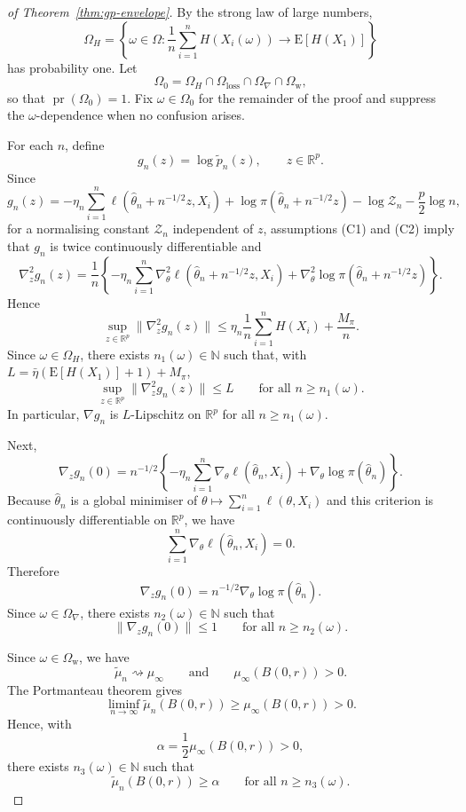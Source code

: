 \documentclass[10pt,a4paper]{amsart}
\renewcommand{\Pr}{\operatorname{pr}}
\begin{document}
\begin{proof}[of Theorem~\ref{thm:gp-envelope}] By the strong
law of large numbers,
\[
\Omega_{H}=\left\{\omega\in\Omega: \frac{1}{n}\sum_{i=1}^{n}H(X_{i}(\omega))\to\mathrm{E}[H(X_{1})]\right\}
\]
has probability one. Let
\[
\Omega_{0}=\Omega_{H}\cap\Omega_{\mathrm{loss}}\cap\Omega_{\nabla}\cap\Omega_{\mathrm{w}},
\]
so that $\Pr(\Omega_{0})=1$. Fix $\omega\in\Omega_{0}$ for the remainder
of the proof and suppress the $\omega$-dependence when no confusion
arises.

For each $n$, define
\[
g_{n}(z)=\log \tilde p_{n}(z),\qquad z\in\mathbb{R}^{p}.
\]
Since
\[
g_{n}(z)=-\eta_{n}\sum_{i=1}^{n}\ell\!\left(\hat{\theta}_{n}+n^{-1/2}z,X_{i}\right)+\log\pi\!\left(\hat{\theta}_{n}+n^{-1/2}z\right)-\log\mathcal{Z}_{n}-\frac{p}{2}\log n,
\]
for a normalising constant $\mathcal{Z}_{n}$ independent of $z$,
assumptions {(C1)} and {(C2)} imply that $g_{n}$ is twice
continuously differentiable and
\[
\nabla_{z}^{2}g_{n}(z)=\frac{1}{n}\left\{ -\eta_{n}\sum_{i=1}^{n}\nabla_{\theta}^{2}\ell\!\left(\hat{\theta}_{n}+n^{-1/2}z,X_{i}\right)+\nabla_{\theta}^{2}\log\pi\!\left(\hat{\theta}_{n}+n^{-1/2}z\right)\right\} .
\]
Hence
\[
\sup_{z\in\mathbb{R}^{p}}\|\nabla_{z}^{2}g_{n}(z)\|\le\eta_{n}\frac{1}{n}\sum_{i=1}^{n}H(X_{i})+\frac{M_{\pi}}{n}.
\]
Since $\omega\in\Omega_{H}$, there exists $n_{1}(\omega)\in\mathbb{N}$
such that, with $L=\bar{\eta}\left(\mathrm{E}[H(X_{1})]+1\right)+M_{\pi}$,
\[
\sup_{z\in\mathbb{R}^{p}}\|\nabla_{z}^{2}g_{n}(z)\|\le L\qquad\text{for all }n\ge n_{1}(\omega).
\]
In particular, $\nabla g_{n}$ is $L$-Lipschitz on $\mathbb{R}^{p}$
for all $n\ge n_{1}(\omega)$.

Next,
\[
\nabla_{z}g_{n}(0)=n^{-1/2}\left\{ -\eta_{n}\sum_{i=1}^{n}\nabla_{\theta}\ell(\hat{\theta}_{n},X_{i})+\nabla_{\theta}\log\pi(\hat{\theta}_{n})\right\} .
\]
Because $\hat{\theta}_{n}$ is a global minimiser of $\theta\mapsto\sum_{i=1}^{n}\ell(\theta,X_{i})$
and this criterion is continuously differentiable on $\mathbb{R}^{p}$,
we have
\[
\sum_{i=1}^{n}\nabla_{\theta}\ell(\hat{\theta}_{n},X_{i})=0.
\]
Therefore
\[
\nabla_{z}g_{n}(0)=n^{-1/2}\nabla_{\theta}\log\pi(\hat{\theta}_{n}).
\]
Since $\omega\in\Omega_{\nabla}$, there exists $n_{2}(\omega)\in\mathbb{N}$
such that
\[
\|\nabla_{z}g_{n}(0)\|\le1\qquad\text{for all }n\ge n_{2}(\omega).
\]

Since $\omega\in\Omega_{\mathrm{w}}$, we have
\[
\tilde\mu_n\rightsquigarrow\mu_{\infty}\qquad\text{and}\qquad\mu_{\infty}(B(0,r))>0.
\]
The Portmanteau theorem gives
\[
\liminf_{n\to\infty}\tilde\mu_n(B(0,r))\ge\mu_{\infty}(B(0,r))>0.
\]
Hence, with
\[
\alpha=\frac{1}{2}\mu_{\infty}(B(0,r))>0,
\]
there exists $n_{3}(\omega)\in\mathbb{N}$ such that
\[
\tilde\mu_n(B(0,r))\ge\alpha\qquad\text{for all }n\ge n_{3}(\omega).
\]


\end{proof}
\end{document}
